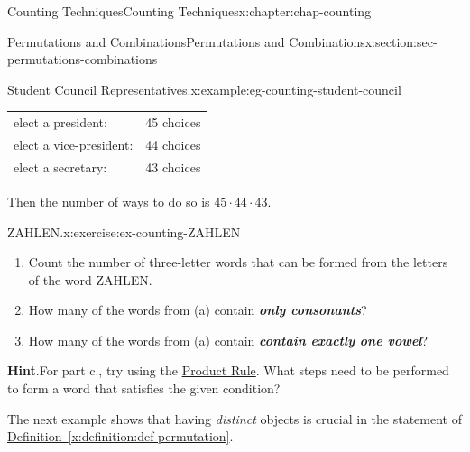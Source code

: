 \documentclass[oneside,10pt,]{book}
\newcommand{\blocktitlefont}{\relax}
\newcommand{\tabularfont}{\relax}
\newcommand{\xreffont}{\relax}
\newcommand{\alert}[1]{\textbf{\textit{#1}}}
\numberwithin{equation}{section}
\newlength{\qrsize}
\newlength{\previewwidth}
\begin{document}
\begin{chapterptx}{Counting Techniques}{}{Counting Techniques}{}{}{x:chapter:chap-counting}
\begin{sectionptx}{Permutations and Combinations}{}{Permutations and Combinations}{}{}{x:section:sec-permutations-combinations}
\begin{example}{Student Council Representatives.}{x:example:eg-counting-student-council}
\begin{sidebyside}{1}{0.15}{0.15}{0}
\begin{sbspanel}{0.7}
{{\tabularfont%
\begin{tabular}{ll}
elect a president:&45 choices\tabularnewline[0pt]
elect a vice-president:&44 choices\tabularnewline[0pt]
elect a secretary:&43 choices
\end{tabular}
}%
\par}
\end{sbspanel}%
\end{sidebyside}%
\par
Then the number of ways to do so is \(45 \cdot 44 \cdot 43\).%
\end{example}
\begin{inlineexercise}{ZAHLEN.}{x:exercise:ex-counting-ZAHLEN}%
%
\begin{enumerate}[label=(\alph*)]
\item{}Count the number of three-letter words that can be formed from the letters of the word ZAHLEN.%
\item{}How many of the words from (a) contain \alert{only consonants}?%
\item{}How many of the words from (a) contain \alert{contain exactly one vowel}?%
\end{enumerate}
%
\par\smallskip%
\noindent\textbf{\blocktitlefont Hint}.\hypertarget{g:hint:id474440}{}\quad{}For part c., try using the \hyperref[x:principle:prin-prod-rule]{Product Rule}. What steps need to be performed to form a word that satisfies the given condition?%
\end{inlineexercise}
The next example shows that having \emph{distinct} objects is crucial in the statement of \hyperref[x:definition:def-permutation]{Definition~{\xreffont\ref{x:definition:def-permutation}}}.%
\begin{sidebyside}{1}{0}{0}{0}%
\begin{sbspanel}{1}%
\setlength{\qrsize}{9em}
\setlength{\previewwidth}{\linewidth}
\addtolength{\previewwidth}{-\qrsize}
\begin{tcbraster}[raster columns=2, raster column skip=1pt, raster halign=center, raster force size=false, raster left skip=0pt, raster right skip=0pt]%
\begin{tcolorbox}[previewstyle, width=\previewwidth]%

\end{tcolorbox}
\end{tcbraster}
\end{sbspanel}
\end{sidebyside}
\end{sectionptx}
\end{chapterptx}
\end{document}
